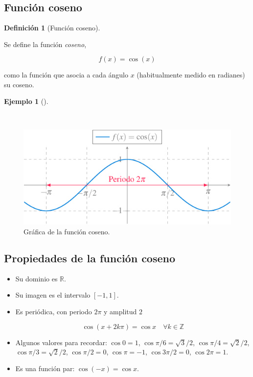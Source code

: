 \documentclass[
  a4paper,
]{scrreport}
\theoremstyle{definition}
\newtheorem{example}{Ejemplo}[chapter]
\theoremstyle{plain}
\theoremstyle{definition}
\newtheorem{definition}{Definición}[chapter]
\theoremstyle{definition}
\theoremstyle{plain}
\theoremstyle{plain}
\theoremstyle{remark}
\begin{document}
\subsection{Función coseno}\label{funciuxf3n-coseno}

\begin{definition}[Función
coseno]\protect\hypertarget{def-funcion-coseno}{}\label{def-funcion-coseno}

Se define la función \emph{coseno},

\[f(x)=\cos(x)\]

como la función que asocia a cada ángulo \(x\) (habitualmente medido en
radianes) su coseno.

\end{definition}

\begin{example}[]\protect\hypertarget{exm-grafica-funcion-coseno}{}\label{exm-grafica-funcion-coseno}

~

\begin{figure}[H]

{\centering \includegraphics[width=5.20833in,height=\textheight]{./img/funciones/funcion-coseno.pdf}

}

\caption{Gráfica de la función coseno.}

\end{figure}%

\end{example}

\subsection{Propiedades de la función
coseno}\label{propiedades-de-la-funciuxf3n-coseno}

\begin{itemize}
\item
  Su dominio es \(\mathbb{R}\).
\item
  Su imagen es el intervalo \([-1,1]\).
\item
  Es periódica, con periodo \(2\pi\) y amplitud \(2\)

  \[\cos (x+2k\pi)= \cos x\quad \forall k\in \mathbb{Z}\]
\item
  Algunos valores para recordar: \(\cos 0=1\),
  \(\cos \pi/6= \sqrt{3}/2\), \(\cos \pi/4=\sqrt{2}/2\),
  \(\cos \pi/3= \sqrt{2}/2\), \(\cos \pi/2 =0\), \(\cos \pi = -1\),
  \(\cos 3\pi/2=0\), \(\cos 2\pi=1\).
\item
  Es una función par: \(\cos(-x)=\cos x\).
\end{itemize}
\end{document}
